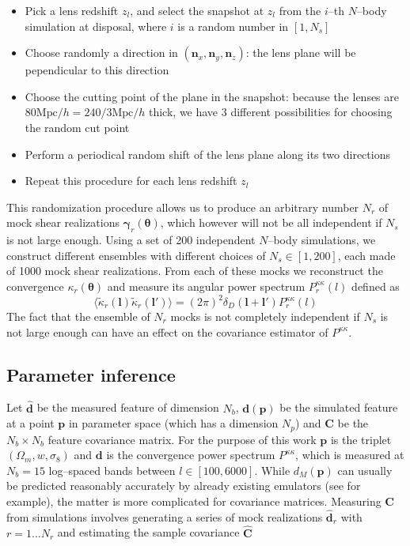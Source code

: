 \documentclass[reprint,aps,prd,superscriptaddress,showkeys,showpacs]{revtex4-1}
\newcommand{\bb}[1]{\mathbf{#1}}
\newcommand{\bbh}[1]{\mathbf{\hat{#1}}}
\begin{document}
\begin{itemize}
\item Pick a lens redshift $z_l$, and select the snapshot at $z_l$ from the $i$--th $N$--body simulation at disposal, where $i$ is a random number in $[1,N_s]$
\item Choose randomly a direction in $(\bb{n}_x,\bb{n}_y,\bb{n}_z)$: the lens plane will be pependicular to this direction
\item Choose the cutting point of the plane in the snapshot: because the lenses are $80\mathrm{Mpc}/h=240/3\mathrm{Mpc}/h$ thick, we have 3 different possibilities for choosing the random cut point
\item Perform a periodical random shift of the lens plane along its two directions
\item Repeat this procedure for each lens redshift $z_l$  
\end{itemize}  
%
This randomization procedure allows us to produce an arbitrary number $N_r$ of mock shear realizations $\pmb{\gamma}_r(\pmb{\theta})$, which however will not be all independent if $N_s$ is not large enough. Using a set of 200 independent $N$--body simulations, we construct different ensembles with different choices of $N_s\in[1,200]$, each made of 1000 mock shear realizations. From each of these mocks we reconstruct the convergence $\kappa_r(\pmb{\theta})$ and measure its angular power spectrum $P^{\kappa\kappa}_r(l)$ defined as
\begin{equation}
\langle\tilde{\kappa}_r(\bb{l})\tilde{\kappa}_r(\bb{l}')\rangle = (2\pi)^2\delta_D(\bb{l}+\bb{l}')P^{\kappa\kappa}_r(l)
\end{equation}
%
The fact that the ensemble of $N_r$ mocks is not completely independent if $N_s$ is not large enough can have an effect on the covariance estimator of $P^{\kappa\kappa}$. 

\subsection{Parameter inference}
%
Let $\bbh{d}$ be the measured feature of dimension $N_b$, $\bb{d}(\bb{p})$ be the simulated feature at a point $\bb{p}$ in parameter space (which has a dimension $N_p$) and $\bb{C}$ be the $N_b\times N_b$ feature covariance matrix. For the purpose of this work $\bb{p}$ is the triplet $(\Omega_m,w,\sigma_8)$ and $\bb{d}$ is the convergence power spectrum $P^{\kappa\kappa}$, which is measured at $N_b=15$ log--spaced bands between $l\in[100,6000]$. While $d_M(\bb{p})$ can usually be predicted reasonably accurately by already existing emulators (see \citep{coyote2,Nicaea} for example), the matter is more complicated for covariance matrices. Measuring $\bb{C}$ from simulations involves generating a series of mock realizations $\bbh{d}_r$ with $r=1...N_r$ and estimating the sample covariance $\bbh{C}$
\end{document}
